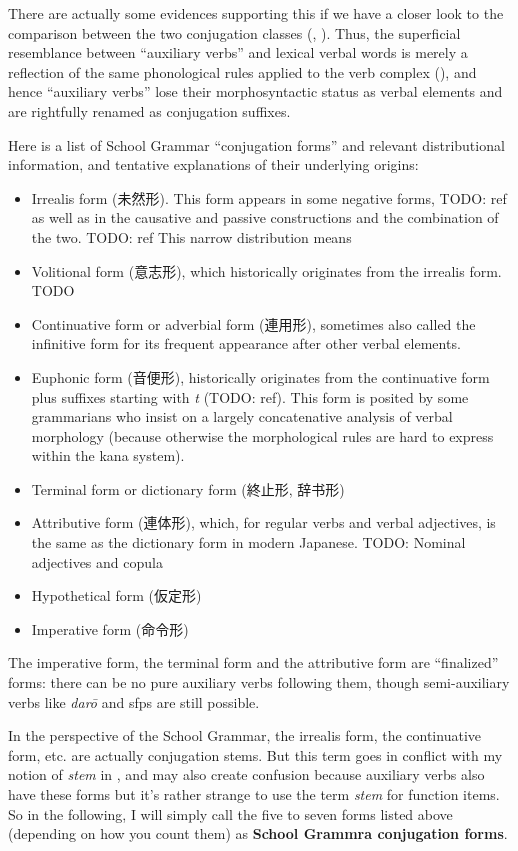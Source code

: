 \documentclass[UTF8, a4paper, oneside, scheme=plain]{ctexart}
\newcommand*{\concept}[1]{\textbf{#1}}
\newcommand*{\term}[1]{\emph{#1}}
\newcommand{\corpus}[1]{\emph{#1}}
\begin{document}
There are actually some evidences supporting this
if we have a closer look to the comparison between the two conjugation classes 
(, ).
Thus, the superficial resemblance between ``auxiliary verbs'' and lexical verbal words 
is merely a reflection of the same phonological rules applied to the verb complex
(),
and hence ``auxiliary verbs'' lose their morphosyntactic status as verbal elements 
and are rightfully renamed as conjugation suffixes.

Here is a list of School Grammar ``conjugation forms'' and relevant distributional information,
and tentative explanations of their underlying origins:
\begin{itemize}
    \item Irrealis form (未然形). 
    This form appears in some negative forms, TODO: ref
    as well as in the causative and passive constructions 
    and the combination of the two. TODO: ref
    This narrow distribution means 
    \item Volitional form (意志形), which historically originates from the irrealis form. TODO
    \item Continuative form or adverbial form (連用形), 
    sometimes also called the infinitive form
    for its frequent appearance after other verbal elements.
    \item Euphonic form (音便形), 
    historically originates from the continuative form plus suffixes starting with \corpus{t}
    (TODO: ref).
    This form is posited by some grammarians 
    who insist on a largely concatenative analysis of verbal morphology 
    (because otherwise the morphological rules are hard to express within the kana system).
    \item Terminal form or dictionary form (終止形, 辞书形)
    \item Attributive form (連体形), which, for regular verbs and verbal adjectives, 
    is the same as the dictionary form in modern Japanese.
    TODO: Nominal adjectives and copula 
    \item Hypothetical form (仮定形)
    \item Imperative form (命令形)
\end{itemize}
The imperative form, the terminal form and the attributive form are ``finalized'' forms: 
there can be no pure auxiliary verbs following them,
though semi-auxiliary verbs like \corpus{dar\={o}} and \ac{sfp}s are still possible.

In the perspective of the School Grammar, the irrealis form, the continuative form, etc. 
are actually conjugation stems.
But this term goes in conflict with my notion of \term{stem} in ,
and may also create confusion because auxiliary verbs also have these forms 
but it's rather strange to use the term \term{stem} for function items.
So in the following,
I will simply call the five to seven forms listed above (depending on how you count them)
as \concept{School Grammra conjugation forms}.
\end{document}
